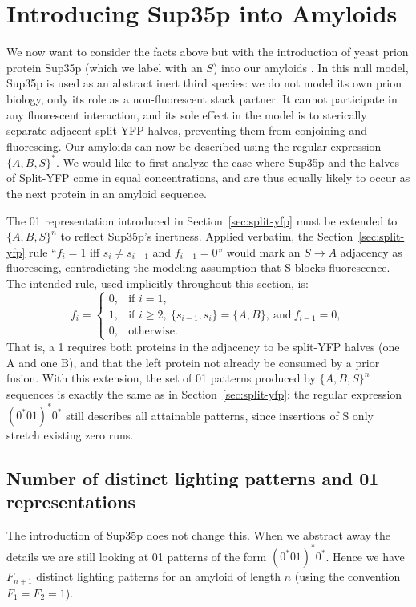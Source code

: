 \documentclass[11pt]{article}
\begin{document}
\section{Introducing Sup35p into Amyloids}\label{sec:sup35}
We now want to consider the facts above but with the introduction of yeast prion protein Sup35p (which we label with an $S$) into our amyloids \cite{patino1996}. In this null model, Sup35p is used as an abstract inert third species: we do not model its own prion biology, only its role as a non-fluorescent stack partner. It cannot participate in any fluorescent interaction, and its sole effect in the model is to sterically separate adjacent split-YFP halves, preventing them from conjoining and fluorescing. Our amyloids can now be described using the regular expression $\{A,B,S\}^*$. We would like to first analyze the case where Sup35p and the halves of Split-YFP come in equal concentrations, and are thus equally likely to occur as the next protein in an amyloid sequence.

The 01 representation introduced in Section~\ref{sec:split-yfp} must be extended to $\{A, B, S\}^n$ to reflect Sup35p's inertness. Applied verbatim, the Section~\ref{sec:split-yfp} rule ``$f_i = 1$ iff $s_i \neq s_{i-1}$ and $f_{i-1} = 0$'' would mark an $S \to A$ adjacency as fluorescing, contradicting the modeling assumption that S blocks fluorescence. The intended rule, used implicitly throughout this section, is:
\[
f_i = \begin{cases}
0, & \text{if } i = 1, \\
1, & \text{if } i \ge 2,\ \{s_{i-1}, s_i\} = \{A, B\},\ \text{and}\ f_{i-1} = 0, \\
0, & \text{otherwise.}
\end{cases}
\]
That is, a 1 requires both proteins in the adjacency to be split-YFP halves (one A and one B), and that the left protein not already be consumed by a prior fusion. With this extension, the set of 01 patterns produced by $\{A,B,S\}^n$ sequences is exactly the same as in Section~\ref{sec:split-yfp}: the regular expression $(0^*01)^*0^*$ still describes all attainable patterns, since insertions of S only stretch existing zero runs.

\subsection{Number of distinct lighting patterns and 01 representations}
The introduction of Sup35p does not change this. When we abstract away the details we are still looking at 01 patterns of the form $(0^*01)^* 0^*$. Hence we have $F_{n+1}$ distinct lighting patterns for an amyloid of length $n$ (using the convention $F_1 = F_2 = 1$).
\end{document}
